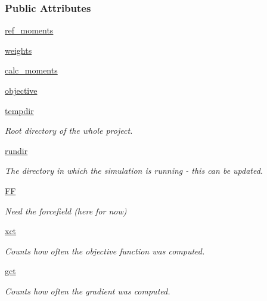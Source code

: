 \subsubsection*{Public Attributes}
\begin{DoxyCompactItemize}
\item 
\hyperlink{classforcebalance_1_1gmxqpio_1_1Monomer__QTPIE_a17de0cabe736ba52ae17f8476db7d35a}{ref\-\_\-moments}
\item 
\hyperlink{classforcebalance_1_1gmxqpio_1_1Monomer__QTPIE_a4cbe02eccd28b60e657bbabc08ec25e0}{weights}
\item 
\hyperlink{classforcebalance_1_1gmxqpio_1_1Monomer__QTPIE_a62d13eba40da98dc26bbee9dce8d0d66}{calc\-\_\-moments}
\item 
\hyperlink{classforcebalance_1_1gmxqpio_1_1Monomer__QTPIE_a0ae55c79486f2f6e3f7bc0bb7f4f387c}{objective}
\item 
\hyperlink{classforcebalance_1_1target_1_1Target_aa1f01b5b78db253b5b66384ed11ed193}{tempdir}
\begin{DoxyCompactList}\small\item\em Root directory of the whole project. \end{DoxyCompactList}\item 
\hyperlink{classforcebalance_1_1target_1_1Target_a6872de5b2d4273b82336ea5b0da29c9e}{rundir}
\begin{DoxyCompactList}\small\item\em The directory in which the simulation is running -\/ this can be updated. \end{DoxyCompactList}\item 
\hyperlink{classforcebalance_1_1target_1_1Target_a38a37919783141ea37fdcf8b00ce0aaf}{F\-F}
\begin{DoxyCompactList}\small\item\em Need the forcefield (here for now) \end{DoxyCompactList}\item 
\hyperlink{classforcebalance_1_1target_1_1Target_aad2e385cfbf7b4a68f1c2cb41133fe82}{xct}
\begin{DoxyCompactList}\small\item\em Counts how often the objective function was computed. \end{DoxyCompactList}\item 
\hyperlink{classforcebalance_1_1target_1_1Target_aa625ac88c6744eb14ef281d9496d0dbb}{gct}
\begin{DoxyCompactList}\small\item\em Counts how often the gradient was computed. \end{DoxyCompactList}\item 

\end{DoxyCompactItemize}
